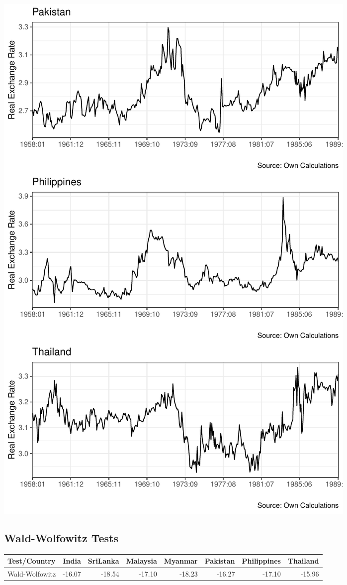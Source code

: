 \documentclass[11pt,preprint, authoryear]{elsarticle}
\let\origfigure\figure
\let\endorigfigure\endfigure
\renewenvironment{figure}[1][2] {
    \expandafter\origfigure\expandafter[H]
} {
    \endorigfigure
}
\let\origtable\table
\let\endorigtable\endtable
\renewenvironment{table}[1][2] {
    \expandafter\origtable\expandafter[H]
} {
    \endorigtable
}
\numberwithin{equation}{section}
\numberwithin{figure}{section}
\numberwithin{table}{section}
\begin{document}
\begin{figure}[H]

{\centering \includegraphics{20346212_files/figure-latex/Figure2-1} 

}

\caption{Plot of Real Exchange Rates over Time\label{Figure1}}\label{fig:Figure2}
\end{figure}

\hypertarget{wald-wolfowitz-tests}{%
\subsection{\texorpdfstring{Wald-Wolfowitz Tests
\label{wald}}{Wald-Wolfowitz Tests }}\label{wald-wolfowitz-tests}}

\begin{table}[H]
\centering
\caption{Wald-Wolfowitz tests \label{tab1}} 
\begin{tabular}{lrrrrrrr}
  \hline
Test/Country & India & SriLanka & Malaysia & Myanmar & Pakistan & Philippines & Thailand \\ 
  \hline
Wald-Wolfowitz & -16.07 & -18.54 & -17.10 & -18.23 & -16.27 & -17.10 & -15.96 \\ 
   \hline
\end{tabular}
\end{table}
\end{document}
